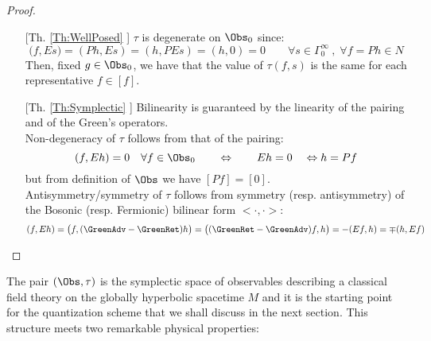 \documentclass[Main]{subfiles}
\begin{document}
				\begin{proof}
								\forcenewline
					\begin{itemize}
						\item [[Th. \ref{Th:WellPosed}]]
							 $\tau$ is degenerate on $\Obs_0$ since:
							 \begin{displaymath}
							 	\big( f , E s \big) = (P h , E s) = (h, PE s) = (h,0) = 0 \qquad \forall s \in \Gamma_0^\infty \: , \; \forall f=Ph \in N
							 \end{displaymath}
							 Then, fixed $g\in \Obs_0$, we have that the value of $\tau(f,s)$ is the same for each representative $f\in[f]$.

						\item [[Th. \ref{Th:Symplectic}]]
							Bilinearity is guaranteed by the linearity of the pairing and of the Green's operators.\\
							Non-degeneracy of $\tau$ follows from that of the pairing:
							\begin{displaymath}
								(f, E h) = 0 \quad \forall f \in \Obs_0 \qquad\Leftrightarrow\qquad E h = 0 \quad \Leftrightarrow h = P f
							\end{displaymath}
							but from definition of $\Obs$ we have $[Pf] = [0]$.\\
							Antisymmetry/symmetry of $\tau $ follows from symmetry (resp. antisymmetry) of the Bosonic (resp. Fermionic) bilinear form $< \cdot, \cdot>$:
							\begin{displaymath}
								( f , E h ) =\big(f, (\GreenAdv - \GreenRet ) h \big)= \big( ( \GreenRet - \GreenAdv) f , h \big) =- ( Ef , h) = \mp(h, Ef)
							\end{displaymath}
					\end{itemize}
				\end{proof}
				\vspace{3mm}
				The pair $(\Obs,\tau)$ is the symplectic space of observables describing a classical field theory on the globally hyperbolic spacetime $M$ and it is the starting point for the quantization scheme that we shall discuss in the next section.
				This structure meets two remarkable physical properties:
\end{document}
